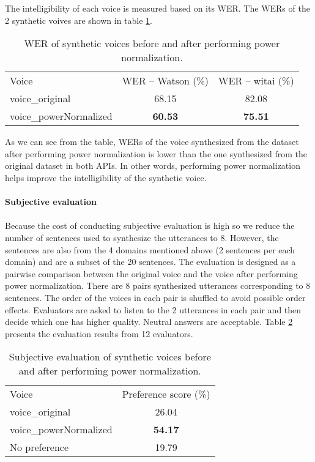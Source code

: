 \documentclass[12pt]{article}
\begin{document}
The intelligibility of each voice is measured based on its WER. The WERs of the 2 synthetic voives are shown in table \ref{tab_werPower}.

\begin{table}[]
\begin{center}
\caption{WER of synthetic voices before and after performing power normalization.}
\label{tab_werPower}
\vspace{3mm}
\begin{tabular}{lcc}
\hline
Voice & WER – Watson (\%) & WER – witai (\%) \\
\cmidrule(l{0pt}r{2pt}){1-1}\cmidrule(l{0pt}r{2pt}){2-2}\cmidrule(l{0pt}r{2pt}){3-3}
voice\_original          & 68.15          & 82.08 \\
voice\_powerNormalized   & \textbf{60.53} & \textbf{75.51} \\
\hline
\end{tabular}
\end{center}
\end{table}

As we can see from the table, WERs of the voice synthesized from the dataset after performing power normalization is lower than the one synthesized from the original dataset in both APIs. In other words, performing power normalization helps improve the intelligibility of the synthetic voice.\\\\
\textbf{Subjective evaluation}\\\\
Because the cost of conducting subjective evaluation is high so we reduce the number of sentences used to synthesize the utterances to 8. However, the sentences are also from the 4 domains mentioned above (2 sentences per each domain) and are a subset of the 20 sentences. The evaluation is designed as a pairwise comparison between the original voice and the voice after performing power normalization. There are 8 pairs synthesized utterances corresponding to 8 sentences. The order of the voices in each pair is shuffled to avoid possible order effects. Evaluators are asked to listen to the 2 utterances in each pair and then decide which one has higher quality. Neutral answers are acceptable. Table \ref{tab_subEvaPower} presents the evaluation results from 12 evaluators.

\begin{table}[]
\begin{center}
\caption{Subjective evaluation of synthetic voices before and after performing power normalization.}
\label{tab_subEvaPower}
\vspace{3mm}
\begin{tabular}{lc}
\hline
Voice & Preference score (\%) \\
\cmidrule(l{0pt}r{2pt}){1-1}\cmidrule(l{0pt}r{2pt}){2-2}
voice\_original         & 26.04 \\
voice\_powerNormalized  & \textbf{54.17} \\
No preference           & 19.79 \\
\hline
\end{tabular}
\end{center}
\end{table}
\end{document}
